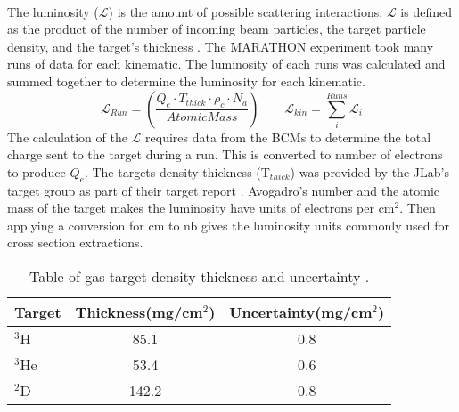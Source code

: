 \paragraph{} The luminosity ($\mathscr{L}$) is the amount of possible scattering interactions. $\mathscr{L}$ is defined as the product of the number of incoming beam particles, the target particle density, and the target's thickness \cite{PnN}. The MARATHON experiment took many runs of data for each kinematic. The luminosity of each runs was calculated and summed together to determine the luminosity for each kinematic. 
\begin{equation}
	\mathscr{L}_{Run} =  \left(\frac{Q_e \cdot T_{thick} \cdot \rho_c \cdot N_a}{AtomicMass} \right) \qquad
	\mathscr{L}_{kin} = \sum_i^{Runs} \mathscr{L}_{i}
\end{equation}
The calculation of the $\mathscr{L}$ requires data from the BCMs to determine the total charge sent to the target during a run. This is converted to number of electrons to produce $Q_e$. The targets density thickness (T$_{thick}$) was provided by the JLab's target group as part of their target report \cite{HATT_eng}. Avogadro's number and the atomic mass of the target makes the luminosity have units of electrons per cm$^2$. Then applying a conversion for cm to nb gives the luminosity units commonly used for cross section extractions.
\begin{table}[]
	\caption{Table of gas target density thickness and uncertainty \cite{HATT_eng}. \label{tgt_table}}
	\centering
	\begin{tabular}{lcc}
	Target &Thickness(mg/cm$^2$) & Uncertainty(mg/cm$^2$)   \\
	\hline
	$^3$H & 85.1 & 0.8 \\
	$^3$He & 53.4 & 0.6\\
	$^2$D & 142.2 & 0.8\\
	\hline
	\end{tabular}
\end{table}
